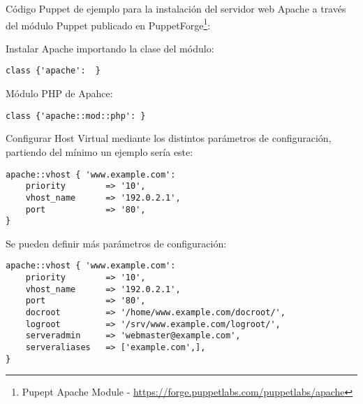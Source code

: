 \par Código Puppet de ejemplo para la instalación del servidor web Apache a través del módulo Puppet publicado en PuppetForge\footnote{Pupept Apache Module - \url{https://forge.puppetlabs.com/puppetlabs/apache}}:

\par Instalar Apache importando la clase del módulo:

\lstset{style=rubybasico}
\begin{lstlisting}[frame=trbl]
class {'apache':  }
\end{lstlisting}

\par Módulo PHP de Apahce:

\lstset{style=rubybasico}
\begin{lstlisting}[frame=trbl]
class {'apache::mod::php': }
\end{lstlisting}

\par Configurar Host Virtual mediante los distintos parámetros de configuración, partiendo del mínimo un ejemplo sería este:

\lstset{style=rubybasico}
\begin{lstlisting}[frame=trbl]
apache::vhost { 'www.example.com':
    priority        => '10',
    vhost_name      => '192.0.2.1',
    port            => '80',
}
\end{lstlisting}

\par Se pueden definir más parámetros de configuración:

\lstset{style=rubybasico}
\begin{lstlisting}[frame=trbl]
apache::vhost { 'www.example.com':
    priority        => '10',
    vhost_name      => '192.0.2.1',
    port            => '80',
    docroot         => '/home/www.example.com/docroot/',
    logroot         => '/srv/www.example.com/logroot/',
    serveradmin     => 'webmaster@example.com',
    serveraliases   => ['example.com',],
}
\end{lstlisting}


